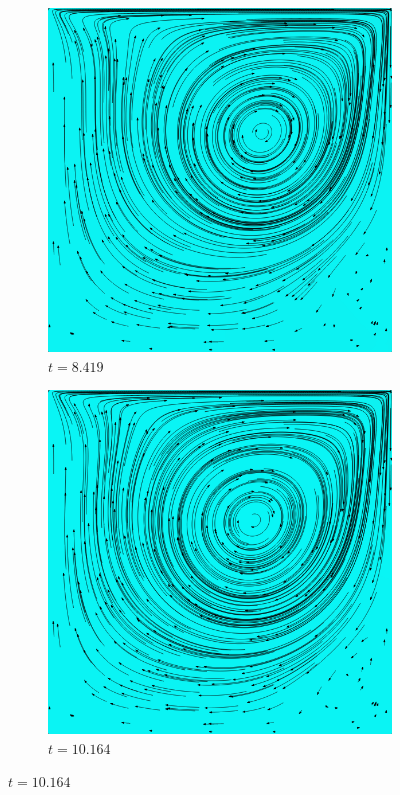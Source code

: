 \begin{figure}[!htb]
			\begin{subfigure}[b]{.5\textwidth}
				\includegraphics[scale = 0.28]{screenshots/re-1000-512-08419.png}
				\caption{$t=8.419$}
			\end{subfigure}%
			\begin{subfigure}[b]{.5\textwidth}
				\includegraphics[scale = 0.28]{screenshots/re-1000-512-10164.png}
				\caption{$t=10.164$}
			\end{subfigure}


\end{figure}
